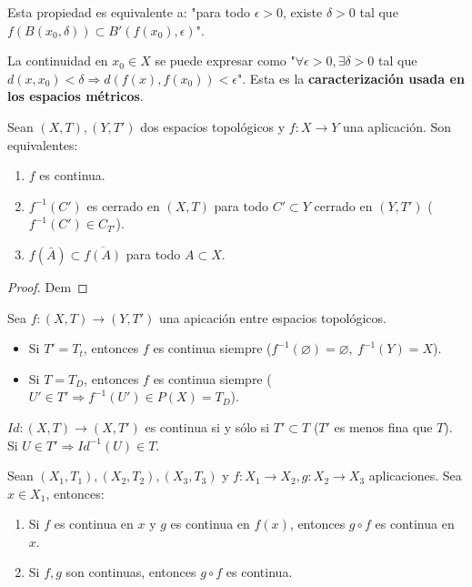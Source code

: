 Esta propiedad es equivalente a: "para todo $\epsilon>0$, existe $\delta>0$ tal que $f(B(x_0,\delta)) \subset B'(f(x_0),\epsilon)$".
\begin{note}
La continuidad en $x_0 \in X$ se puede expresar como "$\forall \epsilon>0, \exists \delta>0$ tal que $d(x,x_0)<\delta \Rightarrow d(f(x),f(x_0))<\epsilon$". Esta es la \textbf{caracterización usada en los espacios métricos}.
\end{note}

\begin{properties}
    Sean $(X,T),(Y,T')$ dos espacios topológicos y $f:X \to Y$ una aplicación. Son equivalentes:
\begin{enumerate}
    \item $f$ es continua.
    \item $f^{-1}(C')$ es cerrado en $(X,T)$ para todo $C' \subset Y$ cerrado en $(Y,T')$ ($f^{-1}(C') \in C_{T'}$).
    \item $f(\bar{A}) \subset \overline{f(A)}$ para todo $A \subset X$.
\end{enumerate}
\end{properties}
\begin{proof}
    Dem
\end{proof}
\begin{exmp}
  Sea $f:(X,T) \to (Y,T')$ una apicación entre espacios topológicos. 
  \begin{itemize}
      \item Si $T'=T_t$, entonces $f$ es continua siempre ($f^{-1}(\varnothing)=\varnothing,\ f^{-1}(Y)=X$).
      \item Si $T=T_D$, entonces $f$ es continua siempre ($U' \in T' \Rightarrow f^{-1}(U') \in P(X) = T_D$).
  \end{itemize}
\end{exmp}
\begin{exmp}
  $Id:(X,T) \to (X,T')$ es continua si y sólo si $T' \subset T$ ($T'$ es menos fina que $T$). Si $U \in T' \Rightarrow Id^{-1}(U) \in T$.
\end{exmp}
\begin{properties}
    Sean $(X_1,T_1), (X_2,T_2), (X_3,T_3)$ y $f:X_1 \to X_2, g: X_2 \to X_3$ aplicaciones. Sea $x \in X_1$, entonces:
    \begin{enumerate}
        \item Si $f$ es continua en $x$ y $g$ es continua en $f(x)$, entonces $g \circ f$ es continua en $x$.
        \item Si $f,g$ son continuas, entonces $g \circ f$ es continua.
    \end{enumerate}
\end{properties}
